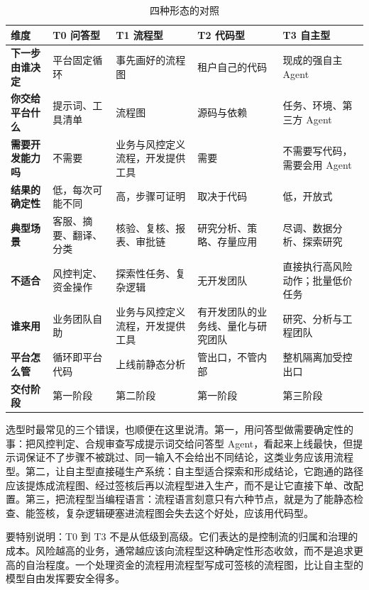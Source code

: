 \begin{table}[htbp]
\centering
\caption{四种形态的对照}
\label{tab:types-compare}
\begin{tabularx}{\textwidth}{@{}>{\bfseries}L{2.3cm}YYYY@{}}
  \toprule
  \textbf{维度} & \textbf{T0 问答型} & \textbf{T1 流程型} & \textbf{T2 代码型} & \textbf{T3 自主型}\\
  \midrule
  下一步由谁决定 & 平台固定循环 & 事先画好的流程图 & 租户自己的代码 & 现成的强自主 Agent\\
  你交给平台什么 & 提示词、工具清单 & 流程图 & 源码与依赖 & 任务、环境、第三方 Agent\\
  需要开发能力吗 & 不需要 & 业务与风控定义流程，开发提供工具 & 需要 & 不需要写代码，需要会用 Agent\\
  结果的确定性 & 低，每次可能不同 & 高，步骤可证明 & 取决于代码 & 低，开放式\\
  典型场景 & 客服、摘要、翻译、分类 & 核验、复核、报表、审批链 & 研究分析、策略、存量应用 & 尽调、数据分析、探索研究\\
  不适合 & 风控判定、资金操作 & 探索性任务、复杂逻辑 & 无开发团队 & 直接执行高风险动作；批量低价任务\\
  谁来用 & 业务团队自助 & 业务与风控定义流程，开发提供工具 & 有开发团队的业务线、量化与研究团队 & 研究、分析与工程团队\\
  平台怎么管 & 循环即平台代码 & 上线前静态分析 & 管出口，不管内部 & 整机隔离加受控出口\\
  交付阶段 & 第一阶段 & 第二阶段 & 第一阶段 & 第三阶段\\
  \bottomrule
\end{tabularx}
\end{table}

选型时最常见的三个错误，也顺便在这里说清。第一，用问答型做需要确定性的事：把风控判定、合规审查写成提示词交给问答型 Agent，看起来上线最快，但提示词保证不了步骤不被跳过、同一输入不会给出不同结论，这类业务应该用流程型。第二，让自主型直接碰生产系统：自主型适合探索和形成结论，它跑通的路径应该提炼成流程图、经过签核后再以流程型进入生产，而不是让它直接下单、改配置。第三，把流程型当编程语言：流程语言刻意只有六种节点，就是为了能静态检查、能签核，复杂逻辑硬塞进流程图会失去这个好处，应该用代码型。

要特别说明：T0 到 T3 不是从低级到高级。它们表达的是控制流的归属和治理的成本。风险越高的业务，通常越应该向流程型这种确定性形态收敛，而不是追求更高的自治程度。一个处理资金的流程用流程型写成可签核的流程图，比让自主型的模型自由发挥要安全得多。

